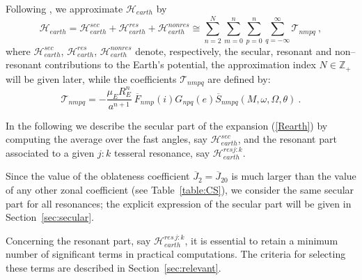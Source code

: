 \documentclass[12pt,reqno]{amsart}
\numberwithin{equation}{section}
\newcommand\equ[1]{{\rm (\ref{#1})}}
\def\integer{{\mathbb Z}}
\begin{document}
Following \cite{CGmajor,CGexternal,CGminor}, we approximate
$\mathcal{H}_{earth}$ by
$$
\mathcal{H}_{earth}=\mathcal{H}^{sec}_{earth}+\mathcal{H}_{earth}^{res}+\mathcal{H}_{earth}^{nonres}\cong
\sum_{n=2}^N \sum_{m=0}^n \sum_{p=0}^n \sum_{q=-\infty}^{\infty} \mathcal{T}_{nmpq} \ ,
$$
where $\mathcal{H}^{sec}_{earth}$, $\mathcal{H}_{earth}^{res}$, $\mathcal{H}_{earth}^{nonres}$ denote, respectively, the secular, resonant and non--resonant
contributions to the Earth's potential, the approximation index $N\in\integer_+$ will be given later,
while the coefficients $\mathcal{T}_{nmpq}$ are defined by:
\begin{equation}\label{T_nmpq_term}
\mathcal{T}_{nmpq}=-\frac{\mu_E R_E^n}{a^{n+1}}\ \overline{F}_{nmp}(i)G_{npq}(e) \overline{S}_{nmpq}(M, \omega, \Omega , \theta)\ .
\end{equation}



In the following we describe the secular part of the expansion \equ{Rearth} by computing the average over the
fast angles, say $\mathcal{H}_{earth}^{sec}$, and the resonant part associated to a given $j:k$ tesseral resonance,
say $\mathcal{H}_{earth}^{resj:k}$.

Since the value of the oblateness coefficient  $\overline{J}_2=\overline{J}_{20}$ is much larger than the value of any other zonal coefficient (see Table~\ref{table:CS}),
we consider the same secular part for all resonances;
the explicit expression of the secular part will be given in Section~\ref{sec:secular}.

Concerning the resonant part, say $\mathcal{H}_{earth}^{res\,j:k}$,  it is essential to retain a minimum number
of significant terms in practical computations. The criteria for selecting these terms are described in
Section~\ref{sec:relevant}.
\end{document}
